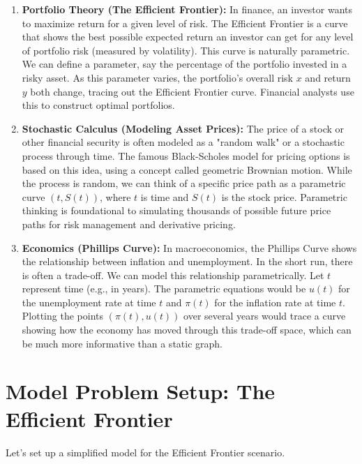 \documentclass{article}
\begin{document}
\begin{enumerate}
    \item \textbf{Portfolio Theory (The Efficient Frontier):} In finance, an investor wants to maximize return for a given level of risk. The Efficient Frontier is a curve that shows the best possible expected return an investor can get for any level of portfolio risk (measured by volatility). This curve is naturally parametric. We can define a parameter, say the percentage of the portfolio invested in a risky asset. As this parameter varies, the portfolio's overall risk $x$ and return $y$ both change, tracing out the Efficient Frontier curve. Financial analysts use this to construct optimal portfolios.

    \item \textbf{Stochastic Calculus (Modeling Asset Prices):} The price of a stock or other financial security is often modeled as a "random walk" or a stochastic process through time. The famous Black-Scholes model for pricing options is based on this idea, using a concept called geometric Brownian motion. While the process is random, we can think of a specific price path as a parametric curve $(t, S(t))$, where $t$ is time and $S(t)$ is the stock price. Parametric thinking is foundational to simulating thousands of possible future price paths for risk management and derivative pricing.

    \item \textbf{Economics (Phillips Curve):} In macroeconomics, the Phillips Curve shows the relationship between inflation and unemployment. In the short run, there is often a trade-off. We can model this relationship parametrically. Let $t$ represent time (e.g., in years). The parametric equations would be $u(t)$ for the unemployment rate at time $t$ and $\pi(t)$ for the inflation rate at time $t$. Plotting the points $(\pi(t), u(t))$ over several years would trace a curve showing how the economy has moved through this trade-off space, which can be much more informative than a static graph.
\end{enumerate}

\section{Model Problem Setup: The Efficient Frontier}

Let's set up a simplified model for the Efficient Frontier scenario.
\end{document}
